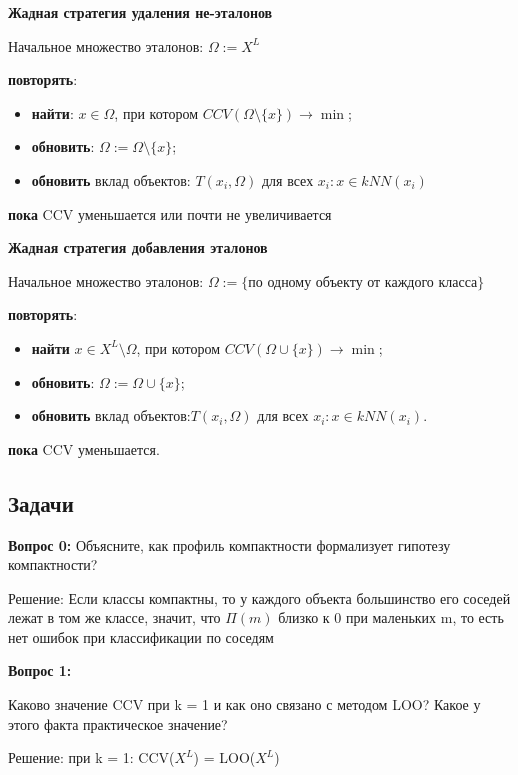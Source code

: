 \textbf{Жадная стратегия удаления не-эталонов}

Начальное множество эталонов: $\Omega := X^L$

\textbf{повторять}: 
\begin{itemize}
    \item \textbf{найти}: $x \in \Omega$, при котором $CCV(\Omega \setminus \{x\}) \to \min$;
    \item \textbf{обновить}: $\Omega := \Omega \setminus \{x\}$;
    \item \textbf{обновить} вклад объектов: $T(x_i, \Omega)$ для всех $x_i: x \in kNN(x_i)$
    
\end{itemize}

\textbf{пока} CCV уменьшается или почти не увеличивается 

\bigskip

\textbf{Жадная стратегия добавления эталонов}  
 
Начальное множество эталонов:  
$\Omega := \{\text{по одному объекту от каждого класса}\}$ 

\textbf{повторять}:
\begin{itemize}
    \item \textbf{найти} $x \in X^L \setminus \Omega$, при котором $CCV(\Omega \cup \{x\}) \to \min$;
    \item \textbf{обновить}: $\Omega := \Omega \cup \{x\}$;
    \item \textbf{обновить} вклад объектов:$T(x_i, \Omega)$ для всех $x_i: x \in kNN(x_i)$.
\end{itemize}

\textbf{пока} CCV уменьшается.  


\subsection{Задачи}

\textbf{Вопрос 0:} Объясните, как профиль компактности формализует гипотезу компактности?

Решение:
Если классы компактны, то у каждого объекта большинство его соседей лежат в том же классе, значит, что $\Pi(m)$ близко к 0 при маленьких m, то есть нет ошибок при классификации по соседям

\textbf{Вопрос 1:  }

Каково значение CCV при k = 1 и как оно связано с методом LOO? Какое у этого факта практическое значение?  

Решение:
при k = 1: CCV($X^L$) = LOO($X^L$)

